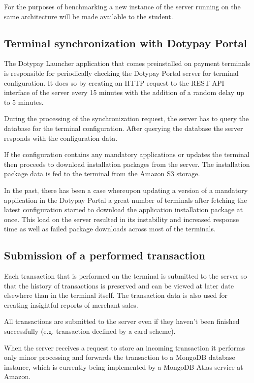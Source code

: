 \documentclass[12pt, a4paper]{article}
\begin{document}
For the purposes of benchmarking a new instance of the server running on the same architecture will be made available to the student.

\subsection{Terminal synchronization with Dotypay Portal}
The Dotypay Launcher application that comes preinstalled on payment terminals is responsible for periodically checking the Dotypay Portal server for terminal configuration. It does so by creating an HTTP request to the REST API interface of the server every 15 minutes with the addition of a random delay up to 5 minutes.

During the processing of the synchronization request, the server has to query the database for the terminal configuration. After querying the database the server responds with the configuration data. 

If the configuration contains any mandatory applications or updates the terminal then proceeds to download installation packages from the server. The installation package data is fed to the terminal from the Amazon S3 storage.

In the past, there has been a case whereupon updating a version of a mandatory application in the Dotypay Portal a great number of terminals after fetching the latest configuration started to download the application installation package at once. 
This load on the server resulted in its instability and increased response time as well as failed package downloads across most of the terminals. 

\subsection{Submission of a performed transaction}
Each transaction that is performed on the terminal is submitted to the server so that the history of transactions is preserved and can be viewed at later date elsewhere than in the terminal itself.
The transaction data is also used for creating insightful reports of merchant sales.

All transactions are submitted to the server even if they haven't been finished successfully (e.g. transaction declined by a card scheme).

When the server receives a request to store an incoming transaction it performs only minor processing and forwards the transaction to a MongoDB database instance, which is currently being implemented by a MongoDB Atlas service at Amazon.
\end{document}
